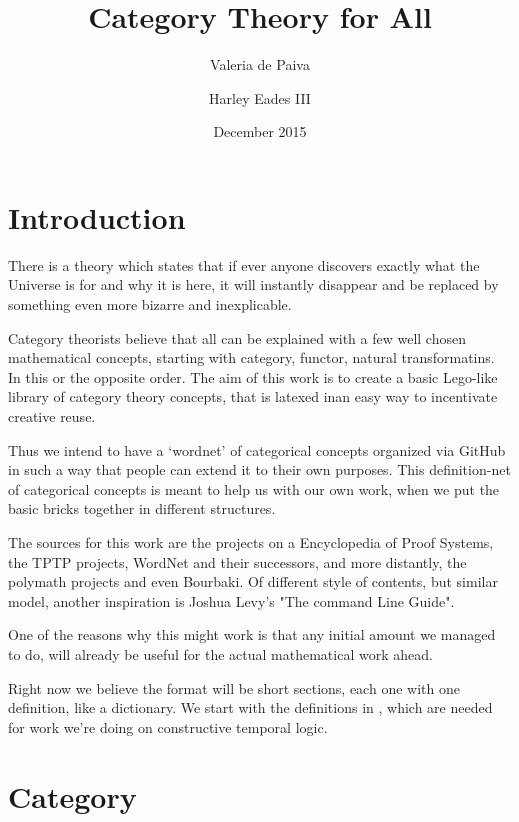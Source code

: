 \documentclass{article}
\title{Category Theory for All}
\author{Valeria de Paiva \and Harley Eades III}
\date{December 2015}
\begin{document}
\maketitle

\section{Introduction}
There is a theory which states that if ever anyone discovers exactly what the Universe is for and why it is here, it will instantly disappear and be replaced by something even more bizarre and inexplicable.

Category theorists believe that all can be explained with a few well chosen mathematical concepts, starting with category, functor, natural transformatins. In this or the opposite order. The aim of this work is to create a basic Lego-like library  of category theory concepts, that is latexed inan easy way to incentivate creative reuse. 

Thus we intend to have a `wordnet' of categorical concepts organized via GitHub in such a way that people can extend it to their own purposes. This definition-net of categorical concepts is meant to help us with our own work, when we put the basic bricks together in different structures.

The sources for this work are the projects on a Encyclopedia of Proof Systems, the TPTP projects, WordNet and their successors, and more distantly, the polymath projects and even Bourbaki. Of different style of contents, but similar model, another inspiration is Joshua Levy's "The command Line Guide".

One of the reasons why this might work is that any initial amount we managed to do, will already be useful for the actual mathematical work ahead. 

Right now we believe the format will be short sections, each one  with one definition, like a dictionary. We start with the definitions in \citep{depaiva1996}, which are needed for work we're doing on constructive temporal logic.

\section{Category}



\end{document}
